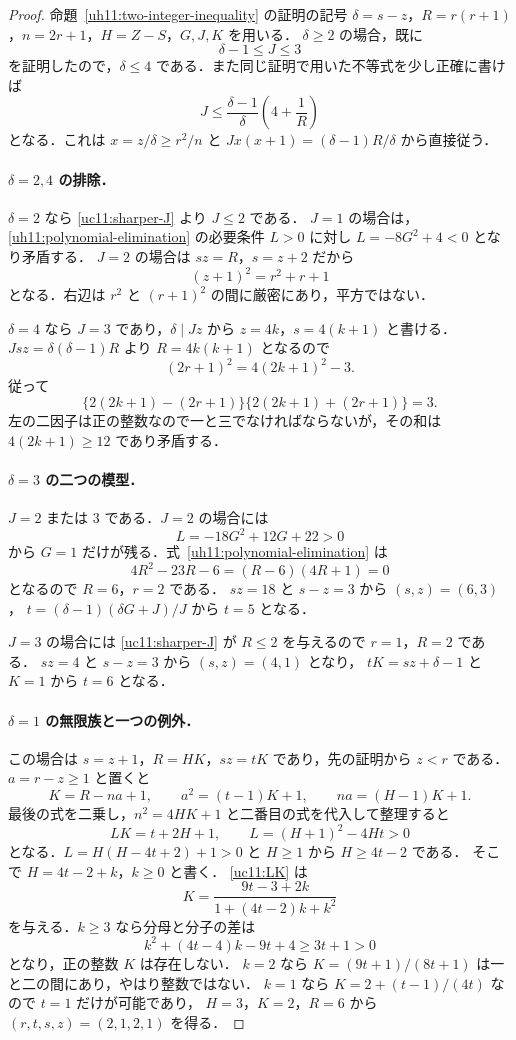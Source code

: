 \begin{proof}
命題~\ref{uh11:two-integer-inequality} の証明の記号
$\delta=s-z$，$R=r(r+1)$，$n=2r+1$，$H=Z-S$，$G,J,K$ を用いる．
$\delta\geq2$ の場合，既に
\[
 \delta-1\leq J\leq3
\]
を証明したので，$\delta\leq4$ である．また同じ証明で用いた不等式を少し正確に書けば
\begin{equation}\label{uc11:sharper-J}
 J\leq\frac{\delta-1}{\delta}\left(4+\frac1R\right)
\end{equation}
となる．これは $x=z/\delta\geq r^2/n$ と
$Jx(x+1)=(\delta-1)R/\delta$ から直接従う．

\paragraph{$\delta=2,4$ の排除．}
$\delta=2$ なら \eqref{uc11:sharper-J} より $J\leq2$ である．
$J=1$ の場合は，\eqref{uh11:polynomial-elimination} の必要条件 $L>0$ に対し
$L=-8G^2+4<0$ となり矛盾する．
$J=2$ の場合は $sz=R$，$s=z+2$ だから
\[
 (z+1)^2=r^2+r+1
\]
となる．右辺は $r^2$ と $(r+1)^2$ の間に厳密にあり，平方ではない．

$\delta=4$ なら $J=3$ であり，$\delta\mid Jz$ から $z=4k$，$s=4(k+1)$ と書ける．
$Jsz=\delta(\delta-1)R$ より $R=4k(k+1)$ となるので
\[
 (2r+1)^2=4(2k+1)^2-3.
\]
従って
\[
 \{2(2k+1)-(2r+1)\}\{2(2k+1)+(2r+1)\}=3.
\]
左の二因子は正の整数なので一と三でなければならないが，その和は
$4(2k+1)\geq12$ であり矛盾する．

\paragraph{$\delta=3$ の二つの模型．}
$J=2$ または $3$ である．$J=2$ の場合には
\[
 L=-18G^2+12G+22>0
\]
から $G=1$ だけが残る．式~\eqref{uh11:polynomial-elimination} は
\[
 4R^2-23R-6=(R-6)(4R+1)=0
\]
となるので $R=6$，$r=2$ である．
$sz=18$ と $s-z=3$ から $(s,z)=(6,3)$，
$t=(\delta-1)(\delta G+J)/J$ から $t=5$ となる．

$J=3$ の場合には \eqref{uc11:sharper-J} が $R\leq2$ を与えるので $r=1$，$R=2$ である．
$sz=4$ と $s-z=3$ から $(s,z)=(4,1)$ となり，
$tK=sz+\delta-1$ と $K=1$ から $t=6$ となる．

\paragraph{$\delta=1$ の無限族と一つの例外．}
この場合は $s=z+1$，$R=HK$，$sz=tK$ であり，先の証明から $z<r$ である．
$a=r-z\geq1$ と置くと
\[
 K=R-na+1,\qquad a^2=(t-1)K+1,\qquad na=(H-1)K+1.
\]
最後の式を二乗し，$n^2=4HK+1$ と二番目の式を代入して整理すると
\begin{equation}\label{uc11:LK}
 LK=t+2H+1,\qquad L=(H+1)^2-4Ht>0
\end{equation}
となる．$L=H(H-4t+2)+1>0$ と $H\geq1$ から $H\geq4t-2$ である．
そこで $H=4t-2+k$，$k\geq0$ と書く．
\eqref{uc11:LK} は
\[
 K=\frac{9t-3+2k}{1+(4t-2)k+k^2}
\]
を与える．$k\geq3$ なら分母と分子の差は
\[
 k^2+(4t-4)k-9t+4\geq3t+1>0
\]
となり，正の整数 $K$ は存在しない．
$k=2$ なら $K=(9t+1)/(8t+1)$ は一と二の間にあり，やはり整数ではない．
$k=1$ なら $K=2+(t-1)/(4t)$ なので $t=1$ だけが可能であり，
$H=3$，$K=2$，$R=6$ から $(r,t,s,z)=(2,1,2,1)$ を得る．


\end{proof}
